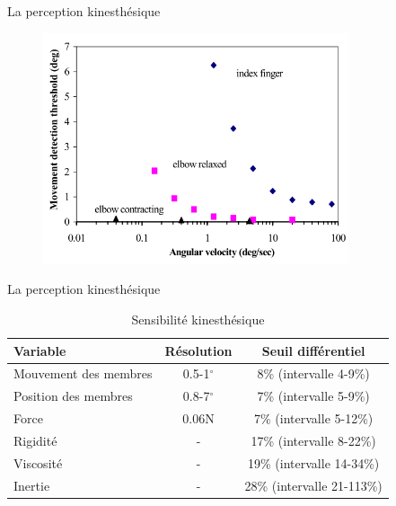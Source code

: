 {
\begin{frame}{La perception kinesthésique}
\begin{figure}
\centering
\includegraphics[width=9cm]{images/jnd_position}
\end{figure}
\end{frame}

\begin{frame}{La perception kinesthésique}
\begin{table}[]
\centering
\footnotesize
	\begin{tabular}[]{lcc}
		\toprule
		\textbf{Variable} & \textbf{Résolution} & \textbf{Seuil différentiel}\\
		\midrule
		Mouvement des membres & 0.5-1$^{\circ}$ & 8\% (intervalle 4-9\%)\\
		Position des membres & 0.8-7$^{\circ}$ & 7\% (intervalle 5-9\%)\\
		Force & 0.06N & 7\% (intervalle 5-12\%)\\
		Rigidité & - & 17\% (intervalle 8-22\%)\\
		Viscosité & - & 19\% (intervalle 14-34\%)\\
		Inertie & - & 28\% (intervalle 21-113\%)\\
		\bottomrule
	\end{tabular}
	\caption{Sensibilité kinesthésique}
\end{table}
\end{frame}
}

